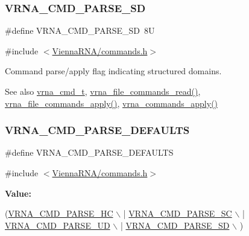 \subsubsection{\texorpdfstring{V\+R\+N\+A\+\_\+\+C\+M\+D\+\_\+\+P\+A\+R\+S\+E\+\_\+\+SD}{VRNA\_CMD\_PARSE\_SD}}
{\footnotesize\ttfamily \#define V\+R\+N\+A\+\_\+\+C\+M\+D\+\_\+\+P\+A\+R\+S\+E\+\_\+\+SD~8U}



{\ttfamily \#include $<$\hyperlink{commands_8h}{Vienna\+R\+N\+A/commands.\+h}$>$}



Command parse/apply flag indicating structured domains. 

\begin{DoxySeeAlso}{See also}
\hyperlink{group__command__files_gaf31afe4c5f8e4bf44a670ab4c3dcd916}{vrna\+\_\+cmd\+\_\+t}, \hyperlink{group__command__files_gae5f56400ed43683338f7bf1c1102655a}{vrna\+\_\+file\+\_\+commands\+\_\+read()}, \hyperlink{group__command__files_gadbe8c9622f7bcc6dcbe3448b98df8656}{vrna\+\_\+file\+\_\+commands\+\_\+apply()}, \hyperlink{group__command__files_gac65d0fe86f7671a2d2b85dda1a3ddc16}{vrna\+\_\+commands\+\_\+apply()} 
\end{DoxySeeAlso}
\mbox{\label{group__command__files_ga0a6c88e21e366dca14958d69cd024008}} 
\subsubsection{\texorpdfstring{V\+R\+N\+A\+\_\+\+C\+M\+D\+\_\+\+P\+A\+R\+S\+E\+\_\+\+D\+E\+F\+A\+U\+L\+TS}{VRNA\_CMD\_PARSE\_DEFAULTS}}
{\footnotesize\ttfamily \#define V\+R\+N\+A\+\_\+\+C\+M\+D\+\_\+\+P\+A\+R\+S\+E\+\_\+\+D\+E\+F\+A\+U\+L\+TS}



{\ttfamily \#include $<$\hyperlink{commands_8h}{Vienna\+R\+N\+A/commands.\+h}$>$}

{\bfseries Value\+:}
\begin{DoxyCode}
(\hyperlink{group__command__files_gac54dec838d7b6bebd5df85f71702d324}{VRNA\_CMD\_PARSE\_HC} \(\backslash\)
                                 | \hyperlink{group__command__files_ga8cad3c1f83e6f149829c49a186a83e21}{VRNA\_CMD\_PARSE\_SC} \(\backslash\)
                                 | \hyperlink{group__command__files_ga6c6409780698826b04ebfed9151d7649}{VRNA\_CMD\_PARSE\_UD} \(\backslash\)
                                 | \hyperlink{group__command__files_gaf5e20210173cdb83bf70256a454f284b}{VRNA\_CMD\_PARSE\_SD} \(\backslash\)
                                 )
\end{DoxyCode}


